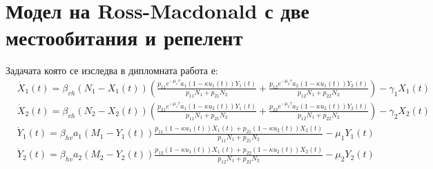\section{Модел на Ross-Macdonald с две местообитания и репелент}
Задачата която се изследва в дипломната работа е:
\begin{equation}
  \label{eq:TheProblem}
  \begin{split}
    &\dot{X}_1(t) = \beta_{vh} (N_1-X_1(t)) \left(\frac{p_{11} e^{-\mu_1 \tau} a_1 (1-\kappa u_1(t)) Y_1(t)}{p_{11} N_1 + p_{21} N_2} + \frac{p_{12} e^{-\mu_2 \tau} a_2 (1-\kappa u_1(t)) Y_2(t)}{p_{12} N_1 + p_{22} N_2}\right) - \gamma_1 X_1(t) \\
    &\dot{X}_2(t) = \beta_{vh} (N_2-X_2(t)) \left(\frac{p_{21} e^{-\mu_1 \tau} a_1 (1-\kappa u_2(t)) Y_1(t)}{p_{11} N_1 + p_{21} N_2} + \frac{p_{22} e^{-\mu_2 \tau} a_2 (1-\kappa u_2(t)) Y_2(t)}{p_{12} N_1 + p_{22} N_2}\right) - \gamma_2 X_2(t) \\
    &\dot{Y}_1(t) = \beta_{hv} a_1 (M_1-Y_1(t)) \frac{p_{11} (1-\kappa u_1(t)) X_1(t) + p_{21} (1-\kappa u_2(t)) X_2(t)}{p_{11} N_1 + p_{21} N_2} - \mu_1 Y_1(t) \\
    &\dot{Y}_2(t) = \beta_{hv} a_2 (M_2-Y_2(t)) \frac{p_{12} (1-\kappa u_1(t)) X_1(t) + p_{22} (1-\kappa u_2(t)) X_2(t)}{p_{12} N_1 + p_{22} N_2} - \mu_2 Y_2(t)
  \end{split}
  \end{equation}

